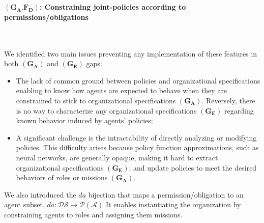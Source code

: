 \documentclass[runningheads]{llncs}
\newcounter{relation}
\begin{document}
\

\paragraph{\textbf{$(\mathbf{G_A.F_D})$: Constraining joint-policies according to permissions/obligations}}

\

\noindent We identified two main issues preventing any implementation of these features in both $(\mathbf{G_A})$ and $(\mathbf{G_E})$ gaps:
%
\begin{itemize}[wide, labelsep = 1em]
    \item The lack of common ground between policies and organizational specifications enabling to know how agents are expected to behave when they are constrained to stick to organizational specifications $(\mathbf{G_A})$. Reversely, there is no way to characterize any organizational specifications $(\mathbf{G_E})$ regarding known behavior induced by agents' policies;
    \item A significant challenge is the intractability of directly analyzing or modifying policies. This difficulty arises because policy function approximations, such as neural networks, are generally opaque, making it hard to extract organizational specifications $(\mathbf{G_E})$; and update policies to meet the desired behaviors of roles or missions $(\mathbf{G_A})$.
\end{itemize}

We also introduced the $da$ bijection that maps a permission/obligation to an agent subset.
$da: \mathcal{DS} \rightarrow \mathcal{P}(\mathcal{A})$
It enables instantiating the organization by constraining agents to roles and assigning them missions.

\

\end{document}
